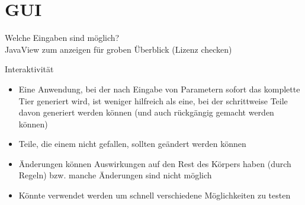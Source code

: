 \section{GUI}
\label{gui}

Welche Eingaben sind möglich?\\

JavaView zum anzeigen für groben Überblick (Lizenz checken)

% 
%   
% 
%   

Interaktivität

\begin{itemize}
 \item Eine Anwendung, bei der nach Eingabe von Parametern sofort das komplette Tier generiert wird, ist weniger hilfreich als eine, bei der schrittweise Teile davon generiert werden können (und auch rückgängig gemacht werden können)
 \item Teile, die einem nicht gefallen, sollten geändert werden können
 \item Änderungen können Auswirkungen auf den Rest des Körpers haben (durch Regeln) bzw. manche Änderungen sind nicht möglich
 \item Könnte verwendet werden um schnell verschiedene Möglichkeiten zu testen
\end{itemize}
